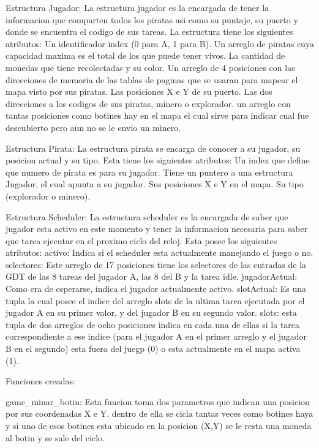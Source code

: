   Estructura Jugador:
      La estructura jugador es la encargada de tener la informacion que comparten todos los piratas asi como
      su puntaje, su puerto y donde se encuentra el codigo de sus tareas.
      La estructura tiene los siguientes atributos:
        Un identificador index (0 para A, 1 para B).
        Un arreglo de piratas cuya capacidad maxima es el total de los que puede tener vivos.
        La cantidad de monedas que tiene recolectadas y su color.
        Un arreglo de 4 posiciones con las direcciones de memoria de las tablas de paginas que se usaran para mapear el mapa visto por
        sus piratas.
        Las posiciones X e Y de su puerto.
        Las dos direcciones a los codigos de sus piratas, minero o explorador.
        un arreglo con tantas posiciones como botines hay en el mapa el cual sirve para indicar cual fue descubierto pero aun no se le envio
        un minero.

  Estructura Pirata:
      La estructura pirata se encarga de conocer a su jugador, su posicion actual y su tipo.
      Esta tiene los siguientes atributos:
        Un index que define que numero de pirata es para su jugador.
        Tiene un puntero a una estructura Jugador, el cual apunta a su jugador.
        Sus posiciones X e Y en el mapa.
        Su tipo (explorador o minero).

  Estructura Scheduler:
      La estructura scheduler es la encargada de saber que jugador esta activo en este momento y tener la informacion
      necesaria para saber que tarea ejecutar en el proximo ciclo del reloj.
      Esta posee los siguientes atributos:
        activo: Indica si el scheduler esta actualmente manejando el juego o no.
        selectores: Este arreglo de 17 posiciones tiene los selectores de las entradas de la GDT de
        las 8 tareas del jugador A, las 8 del B y la tarea idle.
        jugadorActual: Como era de esperarse, indica el jugador actualmente activo.
        slotActual: Es una tupla la cual posee el indice del arreglo slots de la ultima tarea ejecutada por el jugador A
        en su primer valor, y del jugador B en su segundo valor.
        slots: esta tupla de dos arreglos de ocho posiciones indica en cada una de ellas si la tarea correspondiente a ese
        indice (para el jugador A en el primer arreglo y el jugador B en el segundo) esta fuera del juegp (0) o esta actualmente
        en el mapa activa (1).

  Funciones creadas:

    game_minar_botin:
      Esta funcion toma dos parametros que indican una posicion por sus coordenadas X e Y.
      dentro de ella se cicla tantas veces como botines haya y si uno de esos botines esta ubicado en la
      posicion (X,Y) se le resta una moneda al botin y se sale del ciclo.

